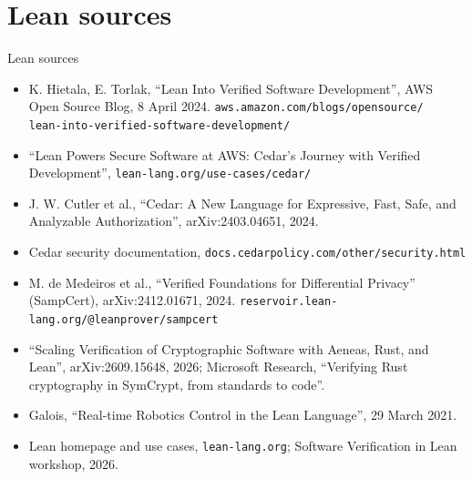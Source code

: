 \documentclass[11pt]{beamer}
\newcommand{\code}[1]{\texttt{#1}}
\begin{document}
\section*{Lean sources}
\begin{frame}{Lean sources}
  \footnotesize
  \begin{itemize}
    \setlength{\itemsep}{0.3em}
    \item K. Hietala, E. Torlak, ``Lean Into Verified Software Development'', AWS Open Source
      Blog, 8 April 2024. \code{aws.amazon.com/blogs/opensource/}\\
      \code{lean-into-verified-software-development/}
    \item ``Lean Powers Secure Software at AWS: Cedar's Journey with Verified Development'',
      \code{lean-lang.org/use-cases/cedar/}
    \item J. W. Cutler et al., ``Cedar: A New Language for Expressive, Fast, Safe, and
      Analyzable Authorization'', arXiv:2403.04651, 2024.
    \item Cedar security documentation, \code{docs.cedarpolicy.com/other/security.html}
    \item M. de Medeiros et al., ``Verified Foundations for Differential Privacy'' (SampCert),
      arXiv:2412.01671, 2024. \code{reservoir.lean-lang.org/@leanprover/sampcert}
    \item ``Scaling Verification of Cryptographic Software with Aeneas, Rust, and Lean'',
      arXiv:2609.15648, 2026; Microsoft Research, ``Verifying Rust cryptography in SymCrypt,
      from standards to code''.
    \item Galois, ``Real-time Robotics Control in the Lean Language'', 29 March 2021.
    \item Lean homepage and use cases, \code{lean-lang.org}; Software Verification in Lean
      workshop, 2026.
  \end{itemize}
\end{frame}
\end{document}
